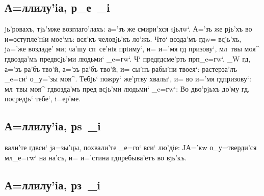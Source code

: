 \documentclass[12pt,a6paper,twoside,dvips,civil=antiqua,cs=izhitsa]{hipbook}
\begin{document}
\slava

\delimpict

\subsection{А=ллилу'iа, р_е~_i}

jь'ровахъ, тjь'мже возглаго'лахъ: а='зъ же смири'хся
sjьлw`. А='зъ же рjь'хъ во и=зступле'нiи мое'мъ: вся'къ
человjь'къ ло'жъ. Что` возда'мъ гд w= всjь'хъ, ja='же
воздаде' ми; ча'шу сп~се'нiя прiиму`, и= и='мя гд
призову`, мл~твы моя^ гд возда'мъ пред\ъ всjь'ми людьми`
_e=гw`. Ч` пред\ъ гд сме'рть прп _e=гw`. _W гд,
а='зъ ра'бъ тво'й, а='зъ ра'бъ тво'й, и= сы'нъ рабы'ни твоея`:
растерза'лъ _e=си` о_у='зы моя^. Тебjь` пожру` же'ртву хвалы`,
и= во и='мя гд призову`: мл~твы моя^ гд возда'мъ пред\ъ
всjь'ми людьми` _e=гw`: Во дво'рjьхъ до'му гд, посредjь`
тебе`, i=ер'ме.

\delimpict

\subsection{А=ллилу'iа, рs~_i}

вали'те гд вси` jа=зы'цы, похвали'те _е=го` вси` лю'дiе: JА='кw
о_у=тверди'ся мл _е=гw` на на'съ, и= и='стина гд пребыва'етъ во
вjь'къ.

\delimpict

\subsection{А=ллилу'iа, рз~_i}
\end{document}
